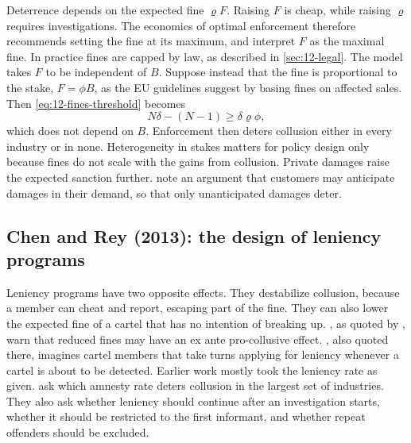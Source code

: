 \begin{remark}\label{rem:12-fine-caps}
Deterrence depends on the expected fine $\varrho F$. Raising $F$ is cheap, while raising $\varrho$ requires
investigations. The economics of optimal enforcement \citep{Becker1968,PolinskyShavell2000} therefore recommends
setting the fine at its maximum, and \citet{ChenRey2013} interpret $F$ as the maximal fine. In practice fines are
capped by law, as described in \cref{sec:12-legal}. The model takes $F$ to be independent of $B$. Suppose instead that
the fine is proportional to the stake, $F = \phi B$, as the EU guidelines suggest by basing fines on affected sales.
Then \eqref{eq:12-fines-threshold} becomes
\begin{equation*}
N\delta - (N-1) \ge \delta\varrho\phi,
\end{equation*}
which does not depend on $B$. Enforcement then deters collusion either in every industry or in none. Heterogeneity in
stakes matters for policy design only because fines do not scale with the gains from collusion. Private damages
raise the expected sanction further. \citet[p.~62, footnote~60]{LevensteinSuslow2006} note an argument that customers
may anticipate damages in their demand, so that only unanticipated damages deter.
\end{remark}

\subsection{Chen and Rey (2013): the design of leniency programs}\label{sec:12-chenrey}

Leniency programs have two opposite effects. They destabilize collusion, because a member can cheat and report,
escaping part of the fine. They can also lower the expected fine of a cartel that has no intention of breaking up.
\citet[p.~349]{MottaPolo2003}, as quoted by \citet[p.~1]{ChenRey2013}, warn that reduced fines may have an ex ante
pro-collusive effect. \citet[p.~137]{Wils2008}, also quoted there, imagines cartel members that take turns applying for
leniency whenever a cartel is about to be detected. Earlier work mostly took the leniency rate as given.
\citet{ChenRey2013} ask which amnesty rate deters collusion in the largest set of industries. They also ask whether
leniency should continue after an investigation starts, whether it should be restricted to the first informant, and
whether repeat offenders should be excluded.

